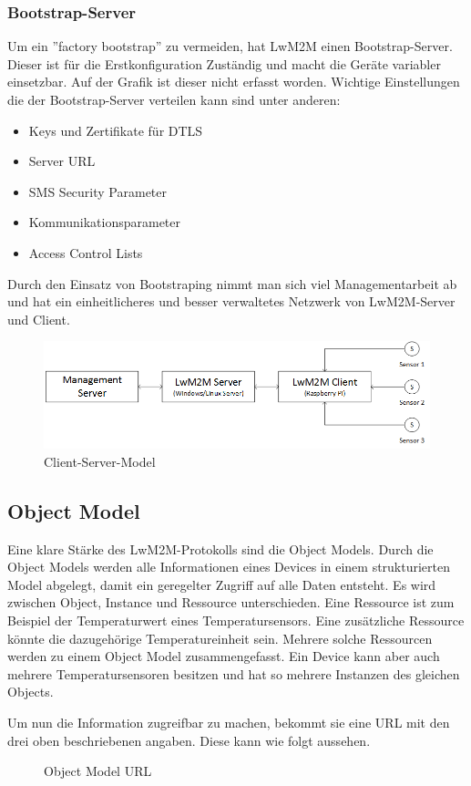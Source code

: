 \subsubsection{Bootstrap-Server}
Um ein ''factory bootstrap'' zu vermeiden, hat LwM2M einen Bootstrap-Server. Dieser ist für die Erstkonfiguration Zuständig und macht die Geräte variabler einsetzbar. Auf der Grafik ist dieser nicht erfasst worden. Wichtige Einstellungen die der Bootstrap-Server verteilen kann sind unter anderen\cite{BootstrapFeatures}:
\begin{itemize}
\item Keys  und Zertifikate für DTLS
\item Server URL
\item SMS Security Parameter
\item Kommunikationsparameter
\item Access Control Lists
\end{itemize}
Durch den Einsatz von Bootstraping nimmt man sich viel Managementarbeit ab und hat ein einheitlicheres und besser verwaltetes Netzwerk von LwM2M-Server und Client.
\begin{figure}[H]
\includegraphics[scale=0.5]{../02_Analyse/images/lwm2m/server_client_model.png}
\caption{Client-Server-Model}
\end{figure}
\subsection{Object Model}
Eine klare Stärke des LwM2M-Protokolls sind die Object Models. Durch die Object Models werden alle Informationen eines Devices in einem strukturierten Model abgelegt, damit ein geregelter Zugriff auf alle Daten entsteht. Es wird zwischen Object, Instance und Ressource unterschieden. Eine Ressource ist zum Beispiel der Temperaturwert eines Temperatursensors. Eine zusätzliche Ressource könnte die dazugehörige Temperatureinheit sein. Mehrere solche Ressourcen werden zu einem Object Model zusammengefasst. Ein Device kann aber auch mehrere Temperatursensoren besitzen und hat so mehrere Instanzen des gleichen Objects.

Um nun die Information zugreifbar zu machen, bekommt sie eine URL mit den drei oben beschriebenen angaben. Diese kann wie folgt aussehen.
\begin{figure}[H]
\caption{Object Model URL}
\end{figure}
